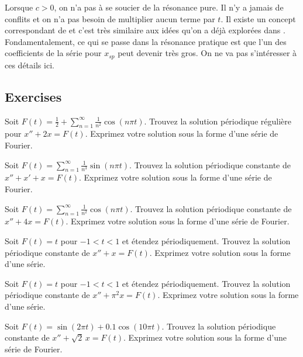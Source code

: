 Lorsque $ c> 0 $, on n'a pas à se soucier de la résonance pure. Il n'y a jamais de conflits et on n'a pas besoin de multiplier aucun terme par $ t $. Il existe un concept correspondant de 
et c'est très similaire aux idées qu'on a déjà explorées dans
.
Fondamentalement, ce qui se passe dans la résonance pratique est que l'un des
 coefficients de la série pour $ x_ {sp} $ peut devenir très gros. On ne va pas s'intéresser à ces détails ici.  

\subsection{Exercises}

\begin{exercise}
Soit $F(t) = \frac{1}{2} + \sum_{n=1}^\infty \frac{1}{n^2} \cos (n \pi t)$.
Trouvez la solution périodique régulière pour
$x'' + 2 x = F(t)$.  Exprimez votre solution sous la forme d'une série de Fourier. 
\end{exercise}

\begin{exercise}
Soit $F(t) = \sum_{n=1}^\infty \frac{1}{n^3} \sin (n \pi t)$.  Trouvez
la solution périodique constante de 
$x'' + x' + x = F(t)$. Exprimez votre solution sous la forme d'une série de Fourier. 
\end{exercise}

\begin{exercise}
Soit $F(t) = \sum_{n=1}^\infty \frac{1}{n^2} \cos (n \pi t)$. Trouvez
la solution périodique constante de 
$x'' + 4 x = F(t)$.  Exprimez votre solution sous la forme d'une série de Fourier. 
\end{exercise}

\begin{exercise}
Soit $F(t) = t$ pour $-1 < t < 1$ et étendez périodiquement.
Trouvez la solution périodique constante de 
$x'' + x = F(t)$.  Exprimez votre solution sous la forme d'une série.
\end{exercise}

\begin{exercise}
Soit $F(t) = t$ pour $-1 < t < 1$ et étendez périodiquement.
Trouvez la solution périodique constante de 
$x'' + \pi^2 x = F(t)$. Exprimez votre solution sous la forme d'une série.
\end{exercise}

\setcounter{exercise}{100}

\begin{exercise}
Soit $F(t) = \sin(2\pi t) + 0.1 \cos(10 \pi t)$.
Trouvez la solution périodique constante de $x'' + \sqrt{2}\, x = F(t)$.
Exprimez votre solution sous la forme d'une série de Fourier.
\end{exercise}

